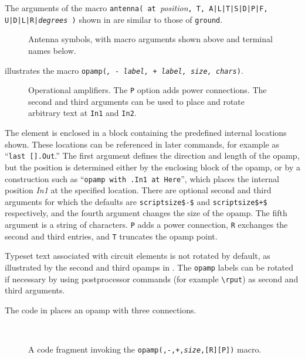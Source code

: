 The arguments of the macro
{\tt antenna( at }{\sl position}{\tt,
  T, A|L|T|S|D|P|F, U|D|L|R|{\sl degrees} )}
shown in  are similar to those of {\tt ground}.
\begin{figure}[h!t]
   
   \caption{Antenna symbols, with macro arguments shown above and
     terminal names below.}
   \label{Antennas}
   \end{figure}

\pagebreak
{} illustrates the macro
{\tt opamp({\sl\linespec, - label, + label, size, chars})\label{OPAMP}}.
\begin{figure}[h!t]
   
   \caption{Operational amplifiers.  The {\tt P} option adds
     power connections.  The second and third arguments can be used
     to place and rotate arbitrary text at {\tt In1} and {\tt In2}.}
   \label{Opamp}
   \end{figure}
The element is enclosed in a block
containing the predefined internal locations shown.
These locations can be referenced in later
commands, for example as ``{\tt last [].Out}.''
The first argument defines the direction and length of the opamp, but the
position is determined either by the enclosing block of the opamp,
or by a construction such as ``{\tt opamp with .In1 at Here}'', which places
the internal position {\sl In1} at the specified location.
There are optional second and third arguments for which the defaults
are {\tt {}scriptsize\$-\$} and {\tt {}scriptsize\$+\$}
respectively, and the fourth argument changes the size of the opamp.
The fifth argument is a string of characters.  {\tt P}
adds a power connection, {\tt R} exchanges the second and
third entries, and {\tt T} truncates the opamp point.

Typeset text associated with circuit elements is not rotated by default,
as illustrated by the second and third opamps in .
The {\tt opamp} labels can be rotated if necessary by 
using postprocessor commands (for example \PSTricks \verb|\rput|)
as second and third arguments.

The code in  places an opamp with three connections.
\begin{figure}[h!t]
   \parbox{4in}{\small }%
   \quad\raise-0.2in\hbox{ }%
   \caption{A code fragment invoking the
    {\tt opamp(\linespec,-,+,{\sl size},[R][P])} macro.}
   \label{oax}
   \end{figure}

